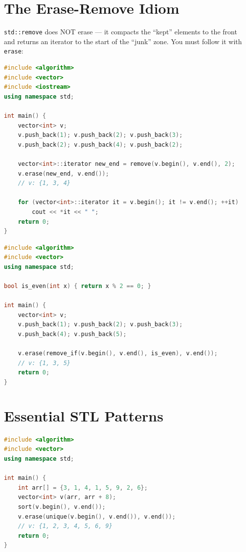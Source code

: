\section{The Erase-Remove Idiom}
\label{sec:erase-remove}

\texttt{std::remove} does NOT erase --- it compacts the ``kept'' elements to the front and returns an iterator to the start of the ``junk'' zone. You must follow it with \texttt{erase}:

\begin{lstlisting}[language=C++, caption={Erase-remove idiom}]
#include <algorithm>
#include <vector>
#include <iostream>
using namespace std;

int main() {
    vector<int> v;
    v.push_back(1); v.push_back(2); v.push_back(3);
    v.push_back(2); v.push_back(4); v.push_back(2);

    vector<int>::iterator new_end = remove(v.begin(), v.end(), 2);
    v.erase(new_end, v.end());
    // v: {1, 3, 4}

    for (vector<int>::iterator it = v.begin(); it != v.end(); ++it)
        cout << *it << " ";
    return 0;
}
\end{lstlisting}

\begin{lstlisting}[language=C++, caption={erase-remove\_if}]
#include <algorithm>
#include <vector>
using namespace std;

bool is_even(int x) { return x % 2 == 0; }

int main() {
    vector<int> v;
    v.push_back(1); v.push_back(2); v.push_back(3);
    v.push_back(4); v.push_back(5);

    v.erase(remove_if(v.begin(), v.end(), is_even), v.end());
    // v: {1, 3, 5}
    return 0;
}
\end{lstlisting}

\section{Essential STL Patterns}
\label{sec:stl-patterns}

\begin{lstlisting}[language=C++, caption={Sort and deduplicate}]
#include <algorithm>
#include <vector>
using namespace std;

int main() {
    int arr[] = {3, 1, 4, 1, 5, 9, 2, 6};
    vector<int> v(arr, arr + 8);
    sort(v.begin(), v.end());
    v.erase(unique(v.begin(), v.end()), v.end());
    // v: {1, 2, 3, 4, 5, 6, 9}
    return 0;
}
\end{lstlisting}

